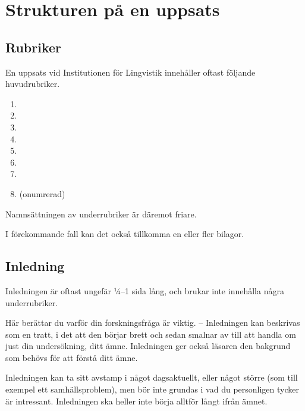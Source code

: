 
\section{Strukturen på en uppsats}
\label{struktur}

\subsection{Rubriker}
\label{rubriker}

En uppsats vid Institutionen för Lingvistik innehåller oftast följande
huvudrubriker.

\begin{enumerate}
\item{}
\item{}
\item{}
\item{}
\item{}
\item{}
\item{}
\item{} (onumrerad)
\end{enumerate}

\noindent Namnsättningen av underrubriker är däremot friare.

I förekommande fall kan det också tillkomma en eller fler bilagor.


\subsection{Inledning}
\label{rubrik.inledning}

Inledningen är oftast ungefär ¼--1 sida lång, och brukar inte innehålla några
underrubriker.

Här berättar du varför din forskningsfråga är viktig. – Inledningen kan
beskrivas som en tratt, i det att den börjar brett och sedan smalnar av till
att handla om just din undersökning, ditt ämne. Inledningen ger också läsaren
den bakgrund som behövs för att förstå ditt ämne.

Inledningen kan ta sitt avstamp i något dagsaktuellt, eller något större (som
till exempel ett samhällsproblem), men bör inte grundas i vad du personligen
tycker är intressant. Inledningen ska heller inte börja alltför långt ifrån
ämnet.



